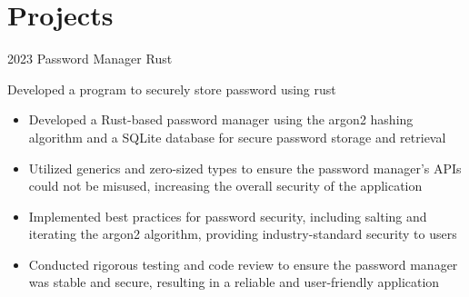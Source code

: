 \documentclass[]{cv-style}
\begin{document}
\section{Projects}
\begin{entrylist}

\entry
{2023}
{Password Manager}
{Rust}
{Developed a program to securely store password using rust\\
\begin{itemize}
    \item Developed a Rust-based password manager using the argon2 hashing algorithm and a SQLite database for secure password storage and retrieval
    \item Utilized generics and zero-sized types to ensure the password manager's APIs could not be misused, increasing the overall security of the application
    \item Implemented best practices for password security, including salting and iterating the argon2 algorithm, providing industry-standard security to users
    \item Conducted rigorous testing and code review to ensure the password manager was stable and secure, resulting in a reliable and user-friendly application
\end{itemize}}


\end{entrylist}
\end{document}
